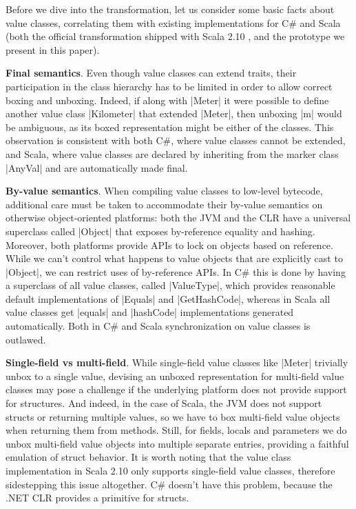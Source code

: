 Before we dive into the transformation, let us consider some basic facts about value classes, correlating them with existing implementations for C\# \cite{dot-net-value-types-www} and Scala (both the official transformation shipped with Scala 2.10 \cite{scala-value-classes-sip}, and the prototype we present in this paper).

\textbf{Final semantics}. Even though value classes can extend traits, their participation in the class hierarchy has to be limited in order to allow correct boxing and unboxing. Indeed, if along with |Meter| it were possible to define another value class |Kilometer| that extended |Meter|, then unboxing |m| would be ambiguous, as its boxed representation might be either of the classes. This observation is consistent with both C\#, where value classes cannot be extended, and Scala, where value classes are declared by inheriting from the marker class |AnyVal| and are automatically made final.

\textbf{By-value semantics}. When compiling value classes to low-level bytecode, additional care must be taken to accommodate their by-value semantics on otherwise object-oriented platforms: both the JVM and the CLR have a universal superclass called |Object| that exposes by-reference equality and hashing. Moreover, both platforms provide APIs to lock on objects based on reference. While we can't control what happens to value objects that are explicitly cast to |Object|, we can restrict uses of by-reference APIs. In C\# this is done by having a superclass of all value classes, called |ValueType|, which provides reasonable default implementations of |Equals| and |GetHashCode|, whereas in Scala all value classes get |equals| and |hashCode| implementations generated automatically. Both in C\# and Scala synchronization on value classes is outlawed.

\textbf{Single-field vs multi-field}. While single-field value clas\-ses like |Meter| trivially unbox to a single value, devising an unboxed representation for multi-field value classes may pose a challenge if the underlying platform does not provide support for structures. And indeed, in the case of Scala, the JVM does not support structs or returning multiple values, so we have to box multi-field value objects when returning them from methods. Still, for fields, locals and parameters we do unbox multi-field value objects into multiple separate entries, providing a faithful emulation of struct behavior. It is worth noting that the value class implementation in Scala 2.10 only supports single-field value classes, therefore sidestepping this issue altogether. C\# doesn't have this problem, because the .NET CLR provides a primitive for structs.

